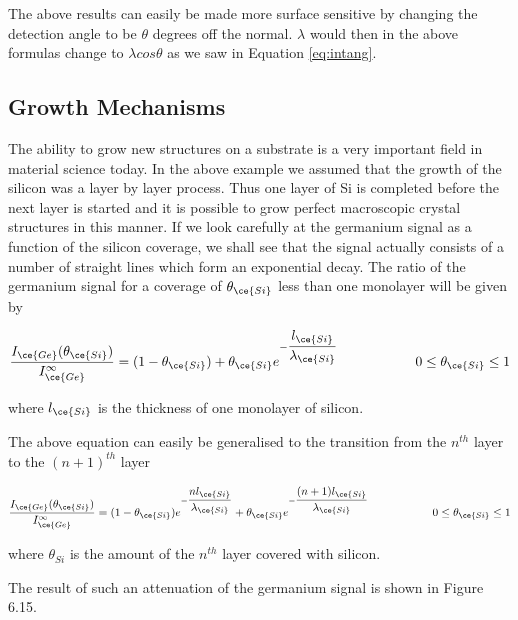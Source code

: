 The above results can easily be made more surface sensitive by changing the detection angle to be $\theta$ degrees off the normal. $\lambda$ would then in the above formulas change to $\lambda cos\theta$ as we saw in Equation \eqref{eq:intang}.

\subsection{Growth Mechanisms}
The ability to grow new structures on a substrate is a very important field in material science today. In the above example we assumed that the growth of the silicon was a layer by layer process. Thus one layer of Si is completed before the next layer is started and it is possible to grow perfect macroscopic crystal structures in this manner. If we look carefully at the germanium signal as a function of the silicon coverage, we shall see that the signal actually consists of a number of straight lines which form an exponential decay. The ratio of the germanium signal for a coverage of $\theta_{\ce{Si}}$ less than one monolayer will be given by

\begin{equation}
\frac{I_{\ce{Ge}}(\theta_{\ce{Si}})}{I_{\ce{Ge}}^{\infty}}=(1-\theta_{\ce{Si}})+\theta_{\ce{Si}}e^{-\dfrac{l_{\ce{Si}}}{\lambda_{\ce{Si}}}}\hspace{2cm}0\leq\theta_{\ce{Si}}\leq 1
\end{equation}

where $l_{\ce{Si}}$ is the thickness of one monolayer of silicon.

The above equation can easily be generalised to the transition from the $n^{th}$ layer to the $(n+1)^{th}$ layer

\begin{equation}
\frac{I_{\ce{Ge}}(\theta_{\ce{Si}})}{I_{\ce{Ge}}^{\infty}}=(1-\theta_{\ce{Si}})e^{-\dfrac{nl_{\ce{Si}}}{\lambda_{\ce{Si}}}}+\theta_{\ce{Si}}e^{-\dfrac{(n+1)l_{\ce{Si}}}{\lambda_{\ce{Si}}}}\hspace{2cm}0\leq\theta_{\ce{Si}}\leq 1
\end{equation}

where $\theta_{Si}$ is the amount of the $n^{th}$ layer covered with silicon.

The result of such an attenuation of the germanium signal is shown in Figure 6.15.\\

          \vspace{9cm}

